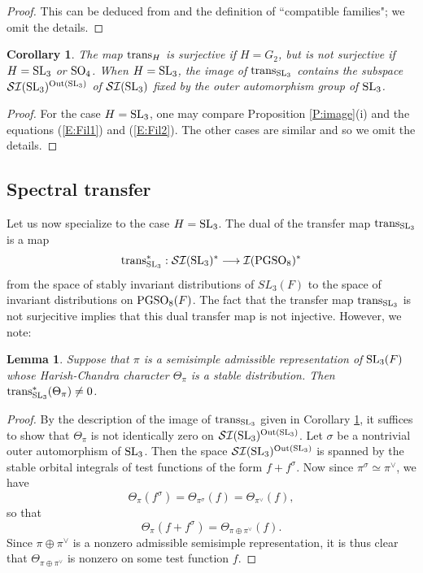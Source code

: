 \documentclass[11pt]{amsart}
\theoremstyle{plain}
\newtheorem{cor}[equation]{Corollary}
\newtheorem{lemma}[equation]{Lemma}
\numberwithin{equation}{section}
\def\SL{{\rm SL}}
\def\PGSO{{\rm PGSO}}
\def\SO{{\rm SO}}
\begin{document}
\begin{proof}
This can be deduced from \cite[\S I.4.3, Lemme, Pg. 80]{MW1} and the definition of ``compatible families"; we omit the details. 
\end{proof}

\begin{cor} \label{C:image}
The map  ${\rm trans}_H$ is surjective if $H = G_2$, but is not surjective if $H = \SL_3$ or $\SO_4$. When $H = \SL_3$, the image of ${\rm trans}_{\SL_3}$ contains the subspace $\mathcal{SI}(\SL_3)^{{\rm Out}(\SL_3)}$ of $\mathcal{SI}(\SL_3)$ fixed by the outer automorphism group of $\SL_3$. 
\end{cor}
 \vskip 5pt
\begin{proof}
For the case $H = \SL_3$, one may compare Proposition \ref{P:image}(i) and the equations (\ref{E:Fil1}) and (\ref{E:Fil2}). The other cases are similar and so we omit the details. 
\end{proof}

 \vskip 5pt

\subsection{\bf Spectral transfer} Let us now specialize to the case $H = \SL_3$. The dual of the transfer map ${\rm trans}_{\SL_3}$ is a map
\[  {\rm trans}_{\SL_3}^* : \mathcal{SI}(\SL_3)^* \longrightarrow \mathcal{I}(\PGSO_8)^* \]
from the space of stably invariant distributions of $SL_3(F)$ to the space of invariant distributions on $\PGSO_8(F)$. 
The fact that the transfer map ${\rm trans}_{\SL_3}$ is not surjecitive implies that this dual transfer map is not injective. However, we note:
\vskip 5pt

\begin{lemma} \label{L:nonzero}
Suppose that $\pi$ is a semisimple admissible representation of $\SL_3(F)$ whose Harish-Chandra character $\Theta_{\pi}$ is a stable distribution.  
Then $  {\rm trans}_{\SL_3}^* (\Theta_{\pi}) \ne 0$.
\end{lemma} 

 \begin{proof}
 By the description of the image of ${\rm trans}_{\SL_3}$ given in Corollary \ref{C:image}, it suffices to show that $\Theta_{\pi}$ is not identically zero on $\mathcal{SI}(\SL_3)^{{\rm Out}(\SL_3)}$.  
 Let $\sigma$ be a nontrivial outer automorphism of $\SL_3$. Then the space $\mathcal{SI}(\SL_3)^{{\rm Out}(\SL_3)}$ is spanned by the stable orbital integrals of test functions of the form $f + f^{\sigma}$. 
 Now since $\pi^{\sigma} \simeq \pi^{\vee}$, we have 
 \[ \Theta_{\pi}(f^{\sigma}) =  \Theta_{\pi^{\sigma}}(f) = \Theta_{\pi^{\vee}}(f),  \]
  so that
 \[  \Theta_{\pi}(f + f^{\sigma}) = \Theta_{\pi \oplus \pi^{\vee}}(f). \]
 Since $\pi \oplus \pi^{\vee}$ is a nonzero admissible semisimple representation, it is thus clear that $\Theta_{\pi \oplus \pi^{\vee}}$ is nonzero on some test function  $f$. 
  \end{proof}
\end{document}
